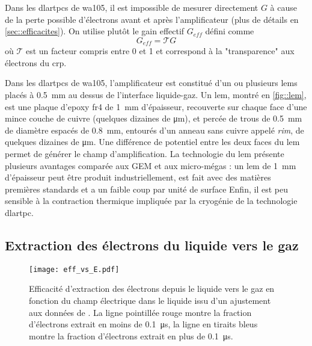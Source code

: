       Dans les \glspl{dlartpc} de \gls{wa105}, il est impossible de mesurer directement $G$ à cause de la perte possible d'électrons avant et après l'amplificateur (plus de détails en \autoref{sec::efficacites}). On utilise plutôt le gain effectif $G_{eff}$ défini comme
      \begin{equation}\label{eq::gain_eff}
        G _{eff}= \mathcal{T}G
      \end{equation}
      où $\mathcal{T}$ est un facteur compris entre 0 et 1 et correspond à la "transparence" aux électrons du \gls{crp}. 

      Dans les \glspl{dlartpc} de \gls{wa105}, l'amplificateur est constitué d'un ou plusieurs \glspl{lem} placés à \SI{0.5}{\milli\meter} au dessus de l'interface liquide-gaz. Un \gls{lem}, montré en \autoref{fig::lem}, est une plaque d'epoxy \gls{fr4} de \SI{1}{\milli\meter} d'épaisseur, recouverte sur chaque face d'une mince couche de cuivre (quelques dizaines de \si{\micro\meter}), et percée de trous de \SI{0.5}{\milli\meter} de diamètre espacés de \SI{0.8}{\milli\meter}, entourés d'un anneau sans cuivre appelé \textit{rim}, de quelques dizaines de \si{\micro\meter}. Une différence de potentiel entre les deux faces du \gls{lem} permet de générer le champ d'amplification. La technologie du \gls{lem} présente plusieurs avantages comparée aux GEM et aux micro-mégas : un \gls{lem} de \SI{1}{\milli\meter} d'épaisseur peut être produit industriellement, est fait avec des matières premières standards et a un faible coup par unité de surface Enfin, il est peu sensible à la contraction thermique impliquée par la cryogénie de la technologie \gls{dlartpc}.

    \subsection{Extraction des électrons du liquide vers le gaz}\label{sec::extraction}

      \begin{figure}[!htb]
        \centering
        \texttt{[image: eff\_vs\_E.pdf]}
        \caption[Efficacité d'extraction en fonction du champ électrique]{\label{fig::guschin}Efficacité d'extraction des électrons depuis le liquide vers le gaz en fonction du champ électrique dans le liquide issu d'un ajustement aux données de \cite{guschin}. La ligne pointillée rouge montre la fraction d'électrons extrait en moins de \SI{0.1}{\micro\second}, la ligne en tiraits bleus montre la fraction d'électrons extrait en plus de \SI{0.1}{\micro\second}.}
      \end{figure}

